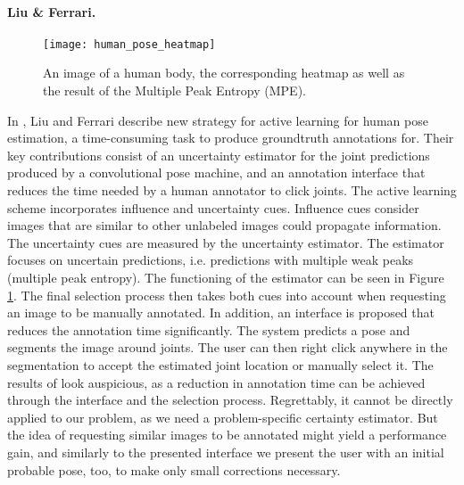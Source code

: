 \paragraph{Liu \& Ferrari.}

\begin{figure}[!tbp]
	\centering
    \texttt{[image: human\_pose\_heatmap]}
    \caption{An image of a human body, the corresponding heatmap as well as the result of the Multiple Peak Entropy (MPE). \cite{humanpose}}
    \label{fig:humanpose}
\end{figure}
In \cite{humanpose}, Liu and Ferrari describe new strategy for active learning for human pose estimation, a time-consuming task to produce groundtruth annotations for. Their key contributions consist of an uncertainty estimator for the joint predictions produced by a convolutional pose machine, and an annotation interface that reduces the time needed by a human annotator to click joints.
\nnewline
The active learning scheme incorporates influence and uncertainty cues. Influence cues consider images that are similar to other unlabeled images could propagate information. The uncertainty cues are measured by the uncertainty estimator. The estimator focuses on uncertain predictions, i.e. predictions with multiple weak peaks (multiple peak entropy). The functioning of the estimator can be seen in Figure \ref{fig:humanpose}. The final selection process then takes both cues into account when requesting an image to be manually annotated.
\nnewline
In addition, an interface is proposed that reduces the annotation time significantly. The system predicts a pose and segments the image around joints. The user can then right click anywhere in the segmentation to accept the estimated joint location or manually select it.
\nnewline
The results of \cite{humanpose} look auspicious, as a reduction in annotation time can be achieved through the interface and the selection process. Regrettably, it cannot be directly applied to our problem, as we need a problem-specific certainty estimator. But the idea of requesting similar images to be annotated might yield a performance gain, and similarly to the presented interface we present the user with an initial probable pose, too, to make only small corrections necessary.